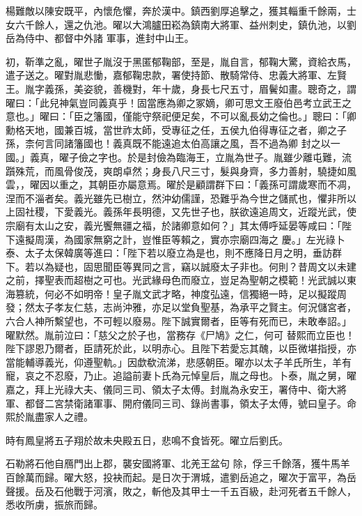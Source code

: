 \begin{pinyinscope}
 楊難敵以陳安既平，內懷危懼，奔於漢中。鎮西劉厚追擊之，獲其輜重千餘兩，士女六千餘人，還之仇池。曜以大鴻臚田崧為鎮南大將軍、益州刺史，鎮仇池，以劉岳為侍中、都督中外諸
 軍事，進封中山王。



 初，靳準之亂，曜世子胤沒于黑匿郁鞠部，至是，胤自言，郁鞠大驚，資給衣馬，遣子送之。曜對胤悲慟，嘉郁鞠忠款，署使持節、散騎常侍、忠義大將軍、左賢王。胤字義孫，美姿貌，善機對，年十歲，身長七尺五寸，眉鬢如畫。聰奇之，謂曜曰：「此兒神氣豈同義真乎！固當應為卿之冢嫡，卿可思文王廢伯邑考立武王之意也。」曜曰：「臣之籓國，僅能守祭祀便足矣，不可以亂長幼之倫也。」聰曰：「卿勳格天地，國兼百城，當世祚太師，受專征之任，五侯九伯得專征之者，卿之子孫，柰何言同諸籓國也！義真既不能遠追太伯高讓之風，吾不過為卿
 封之以一國。」義真，曜子儉之字也。於是封儉為臨海王，立胤為世子。胤雖少離屯難，流躓殊荒，而風骨俊茂，爽朗卓然；身長八尺三寸，髮與身齊，多力善射，驍捷如風雲，，曜因以重之，其朝臣亦屬意焉。曜於是顧謂群下曰：「義孫可謂歲寒而不凋，涅而不淄者矣。義光雖先已樹立，然沖幼儒謹，恐難乎為今世之儲貳也，懼非所以上固社稷，下愛義光。義孫年長明德，又先世子也，朕欲遠追周文，近蹤光武，使宗廟有太山之安，義光饗無疆之福，於諸卿意如何？」其太傅呼延晏等咸曰：「陛下遠擬周漢，為國家無窮之計，豈惟臣等賴之，實亦宗廟四海之
 慶。」左光祿卜泰、太子太保韓廣等進曰：「陛下若以廢立為是也，則不應降日月之明，垂訪群下。若以為疑也，固思聞臣等異同之言，竊以誠廢太子非也。何則？昔周文以未建之前，擇聖表而超樹之可也。光武緣母色而廢立，豈足為聖朝之模範！光武誠以東海篡統，何必不如明帝！皇子胤文武才略，神度弘遠，信獨絕一時，足以擬蹤周發；然太子孝友仁慈，志尚沖雅，亦足以堂負聖基，為承平之賢主。何況儲宮者，六合人神所繫望也，不可輕以廢易。陛下誠實爾者，臣等有死而已，未敢奉詔。」曜默然。胤前泣曰：「慈父之於子也，當務存《尸鳩》之仁，何可
 替熙而立臣也！陛下謬恩乃爾者，臣請死於此，以明赤心。且陛下若愛忘其醜，以臣微堪指授，亦當能輔導義光，仰遵聖軌。」因歔欷流涕，悲感朝臣。曜亦以太子羊氏所生，羊有寵，哀之不忍廢，乃止。追謚前妻卜氏為元悼皇后，胤之母也。卜泰，胤之舅，曜嘉之，拜上光祿大夫、儀同三司、領太子太傅。封胤為永安王，署侍中、衛大將軍、都督二宮禁衛諸軍事、開府儀同三司、錄尚書事，領太子太傅，號曰皇子。命熙於胤盡家人之禮。



 時有鳳皇將五子翔於故未央殿五日，悲鳴不食皆死。曜立后劉氏。



 石勒將石他自鴈門出上郡，襲安國將軍、北羌王盆句
 除，俘三千餘落，獲牛馬羊百餘萬而歸。曜大怒，投袂而起。是日次于渭城，遣劉岳追之，曜次于富平，為岳聲援。岳及石他戰于河濱，敗之，斬他及其甲士一千五百級，赴河死者五千餘人，悉收所虜，振旅而歸。




\end{pinyinscope}
